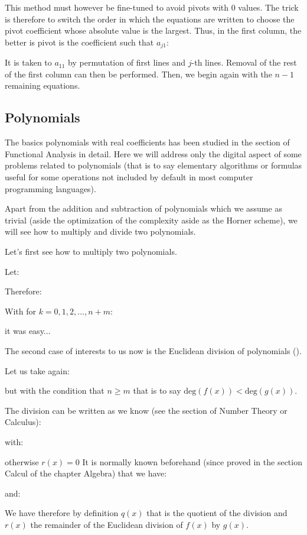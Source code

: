 		This method must however be fine-tuned to avoid pivots with $0$ values. The trick is therefore to switch the order in which the equations are written to choose the pivot coefficient whose absolute value is the largest. Thus, in the first column, the better is pivot is the coefficient such that $a_{j1}$:
		
It is taken to $a_{11}$ by permutation of first lines and $j$-th lines. Removal of the rest of the first column can then be performed. Then, we begin again with the $n-1$ remaining equations.

	\pagebreak
	\subsection{Polynomials}
	
	The basics polynomials with real coefficients has been studied in the section of Functional Analysis in detail. Here we will address only the digital aspect of some problems related to polynomials (that is to say elementary algorithms or formulas useful for some operations not included by default in most computer programming languages).
	
	Apart from the addition and subtraction of polynomials which we assume as trivial (aside the optimization of the complexity aside as the Horner scheme), we will see how to multiply and divide two polynomials.
	
	Let's first see how to multiply two polynomials.
	
	Let:
	
	Therefore:
	
	With for $k=0,1,2,...,n+m$:
	
	it was easy...
	
	The second case of interests to us now is the Euclidean division of polynomials ().
	
	Let us take again:
	
	but with the condition that $n \geq m$ that is to say $\text{deg}(f(x))<\text{deg}(g(x))$.
	
	The division can be written as we know (see the section of Number Theory or Calculus):
	
	with:
	
	otherwise $r(x)=0$
	It is normally known beforehand (since proved in the section Calcul of the chapter Algebra) that we have:
	
	and:
	
	We have therefore by definition $q(x)$ that is the quotient of the division and $r(x)$ the remainder of the Euclidean division of $f(x)$ by $g (x)$.
	
